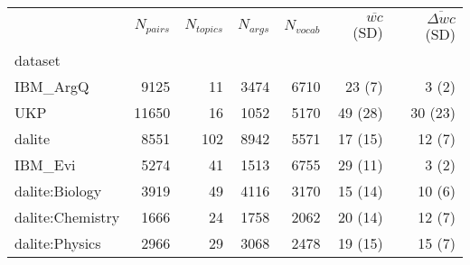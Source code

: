 \newlength{\digitlen}
\settowidth{\digitlen}{0}
\begin{tabular}{lrrrrrr}
\toprule
{} &  $N_{pairs}$ &  $N_{topics}$ &  $N_{args}$  &  $N_{vocab}$ & 
$\overline{wc}$ (SD) & 
$\overline{\Delta wc}$ (SD)\\
dataset          &          &           &         &        &              &                   \\
\midrule
IBM\_ArgQ         &     9125 &        11 &    3474 &   6710 &       23 (\hspace{\digitlen}7) &             3 (\hspace{\digitlen}2) \\
UKP              &    11650 &        16 &    1052 &   5170 &      49 (28) &           30 (23) \\
dalite           &     8551 &       102 &    8942 &   5571 &      17 (15) &            12 (\hspace{\digitlen}7) \\
IBM\_Evi          &     5274 &        41 &    1513 &   6755 &      29 (11) &             3 (\hspace{\digitlen}2) \\
dalite:Biology   &     3919 &        49 &    4116 &   3170 &      15 (14) &            10 (\hspace{\digitlen}6) \\
dalite:Chemistry &     1666 &        24 &    1758 &   2062 &      20 (14) &            12 (\hspace{\digitlen}7) \\
dalite:Physics   &     2966 &        29 &    3068 &   2478 &      19 (15) &            15 (\hspace{\digitlen}7) \\
\bottomrule
\end{tabular}
